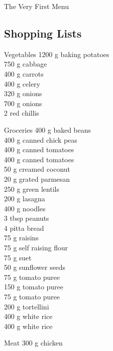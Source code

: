 \begin{menu}{The Very First Menu}
    \subsection*{Shopping Lists}
      \begin{shoppinglist}{Vegetables}
      1200 g baking potatoes \\ 
      750 g cabbage \\ 
      400 g carrots \\ 
      400 g celery \\ 
      320 g onions \\ 
      700 g onions \\ 
      2  red chillis \\ 
      \end{shoppinglist}%
      \begin{shoppinglist}{Groceries}
      400 g baked beans \\ 
      400 g canned chick peas \\ 
      400 g canned tomatoes \\ 
      400 g canned tomatoes \\ 
      50 g creamed coconut \\ 
      20 g grated parmesan \\ 
      250 g green lentils \\ 
      200 g lasagna \\ 
      400 g noodles \\ 
      3 tbsp peanuts \\ 
      4  pitta bread \\ 
      75 g raisins \\ 
      75 g self raising flour \\ 
      75 g suet \\ 
      50 g sunflower seeds \\ 
      75 g tomato puree \\ 
      150 g tomato puree \\ 
      75 g tomato puree \\ 
      200 g tortellini \\ 
      400 g white rice \\ 
      400 g white rice \\ 
      \end{shoppinglist}%
      \par\vfil %
      \begin{shoppinglist}{Meat}
      300 g chicken \\ 

\end{shoppinglist}
\end{menu}
